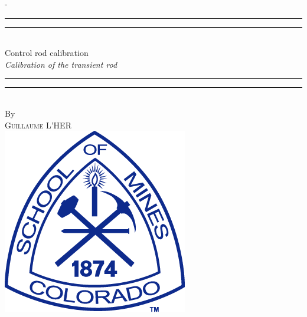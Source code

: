 %
%
% 
%
%
\begin{titlingpage}
\begin{SingleSpace}
\calccentering{\unitlength} 
\begin{adjustwidth*}{\unitlength}{-\unitlength}
\vspace*{13mm}
\begin{center}
\rule[0.5ex]{\linewidth}{2pt}\vspace*{-\baselineskip}\vspace*{3.2pt}
\rule[0.5ex]{\linewidth}{1pt}\\[\baselineskip]
{\HUGE Control rod calibration }\\[4mm]
{\Large \textit{Calibration of the transient rod}}\\
\rule[0.5ex]{\linewidth}{1pt}\vspace*{-\baselineskip}\vspace{3.2pt}
\rule[0.5ex]{\linewidth}{2pt}\\
\vspace{6.5mm}
{\large By}\\
\vspace{6.5mm}
{\large\textsc{Guillaume L'HER}}\\
\vspace{11mm}
\includegraphics[scale=0.6]{logos/CSM}\\

\end{center}
\end{adjustwidth*}
\end{SingleSpace}
\end{titlingpage}
